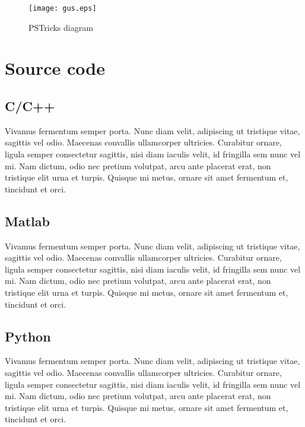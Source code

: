 \documentclass[11pt,a4paper,twoside]{article}
\begin{document}
\begin{figure}[htb]
  \begin{center}
    \texttt{[image: gus.eps]}
    \caption{PSTricks diagram}
  \end{center}
\end{figure}


\section{Source code}
\subsection{C/C++}

Vivamus fermentum semper porta. Nunc diam velit, adipiscing ut tristique
vitae, sagittis vel odio. Maecenas convallis ullamcorper ultricies.
Curabitur ornare, ligula semper consectetur sagittis, nisi diam iaculis
velit, id fringilla sem nunc vel mi. Nam dictum, odio nec pretium
volutpat, arcu ante placerat erat, non tristique elit urna et turpis.
Quisque mi metus, ornare sit amet fermentum et, tincidunt et orci. 


\subsection{Matlab}

Vivamus fermentum semper porta. Nunc diam velit, adipiscing ut tristique
vitae, sagittis vel odio. Maecenas convallis ullamcorper ultricies.
Curabitur ornare, ligula semper consectetur sagittis, nisi diam iaculis
velit, id fringilla sem nunc vel mi. Nam dictum, odio nec pretium
volutpat, arcu ante placerat erat, non tristique elit urna et turpis.
Quisque mi metus, ornare sit amet fermentum et, tincidunt et orci. 


\subsection{Python}

Vivamus fermentum semper porta. Nunc diam velit, adipiscing ut tristique
vitae, sagittis vel odio. Maecenas convallis ullamcorper ultricies.
Curabitur ornare, ligula semper consectetur sagittis, nisi diam iaculis
velit, id fringilla sem nunc vel mi. Nam dictum, odio nec pretium
volutpat, arcu ante placerat erat, non tristique elit urna et turpis.
Quisque mi metus, ornare sit amet fermentum et, tincidunt et orci. 
\end{document}
